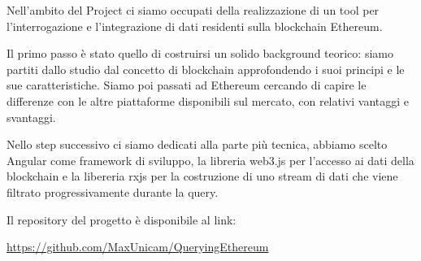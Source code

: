 \par \noindent
Nell'ambito del Project ci siamo occupati della realizzazione di un tool per l'interrogazione e l'integrazione di dati residenti sulla blockchain Ethereum.
\vspace{0.5cm}
\par \noindent
Il primo passo è stato quello di costruirsi un solido background teorico: siamo partiti dallo studio dal concetto di blockchain approfondendo i suoi principi e le sue caratteristiche. Siamo poi passati ad Ethereum cercando di capire le differenze con le altre piattaforme disponibili sul mercato, con relativi vantaggi e svantaggi.
\vspace{0.5cm}
\par \noindent
Nello step successivo ci siamo dedicati alla parte più tecnica, abbiamo scelto Angular come framework di sviluppo, la libreria web3.js per l'accesso ai dati della blockchain e la libereria rxjs per la costruzione di uno stream di dati che viene filtrato progressivamente durante la query.

\vspace{0.5cm}

\par \noindent
Il repository del progetto è disponibile al link:

\url{https://github.com/MaxUnicam/QueryingEthereum}
